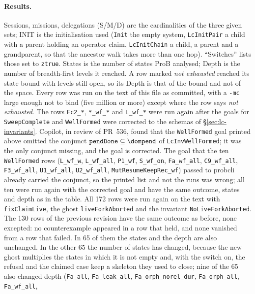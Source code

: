 \documentclass[a4paper,10pt,fleqn]{article}
\newcommand{\field}[1]{\texttt{#1}}
\begin{document}
\paragraph{Results.} Sessions, missions, delegations (S/M/D) are the
cardinalities of the three given sets; INIT is the initialisation used
(\field{Init} the empty system, \field{LcInitPair} a child with a parent
holding an operator claim, \field{LcInitChain} a child, a parent and a
grandparent, so that the ancestor walk takes more than one hop).
``Switches'' lists those set to \field{ztrue}. States is the number of
states ProB analysed; Depth is the number of breadth-first levels it
reached. A row marked \emph{not exhausted} reached its state bound with
levels still open, so its Depth is that of the bound and not of the
space. Every row was run on the text of this file as committed, with a
\texttt{-mc} large enough not to bind (five million or more) except where
the row says \emph{not exhausted}. The rows \texttt{Fc2\_*},
\texttt{*\_wf\_*} and \texttt{L\_wf\_*} were run again after the goals for
\field{SweepComplete} and \field{WellFormed} were corrected to the schemas
of \S\ref{sec:lc-invariants}. Copilot, in review of PR~536, found that the
\field{WellFormed} goal printed above omitted the conjunct
$\field{pendDone}\subseteq\dom\field{pend}$ of
\field{LcInvWellFormed}; it was the only conjunct missing, and the goal is
corrected. The goal that the ten \field{WellFormed} rows
(\texttt{L\_wf\_w}, \texttt{L\_wf\_all}, \texttt{P1\_wf}, \texttt{S\_wf\_on},
\texttt{Fa\_wf\_all}, \texttt{C9\_wf\_all}, \texttt{F3\_wf\_all},
\texttt{U1\_wf\_all}, \texttt{U2\_wf\_all}, \texttt{MutResumeKeepRec\_wf})
passed to probcli already carried the conjunct, so the printed list and not
the runs was wrong; all ten were run again with the corrected goal and have
the same outcome, states and depth as in the table. All 172 rows were run
again on the text with \field{fixClaimLive}, the ghost
\field{liveForkAborted} and the invariant \field{NoLiveForkAborted}. The 130
rows of the previous revision have the same outcome as before, none
excepted: no counterexample appeared in a row that held, and none vanished
from a row that failed. In 65 of them the states and the depth are also
unchanged. In the other 65 the number of states has changed, because the new
ghost multiplies the states in which it is not empty and, with the switch on,
the refusal and the claimed case keep a skeleton they used to close; nine of
the 65 also changed depth (\texttt{Fa\_all}, \texttt{Fa\_leak\_all},
\texttt{Fa\_orph\_norel\_dur}, \texttt{Fa\_orph\_all}, \texttt{Fa\_wf\_all},
\end{document}
